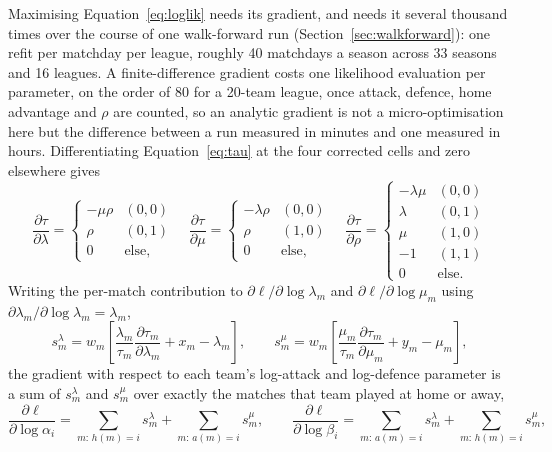 \documentclass[11pt,a4paper]{article}
\begin{document}
Maximising Equation~\eqref{eq:loglik} needs its gradient, and needs it
several thousand times over the course of one walk-forward run
(Section~\ref{sec:walkforward}): one refit per matchday per league, roughly
40 matchdays a season across 33 seasons and 16 leagues. A finite-difference
gradient costs one likelihood evaluation per parameter, on the order of 80
for a 20-team league, once attack, defence, home advantage and $\rho$ are
counted, so an analytic gradient is not a micro-optimisation here but the
difference between a run measured in minutes and one measured in hours.
Differentiating Equation~\eqref{eq:tau} at the four corrected cells and zero
elsewhere gives
\begin{equation}
  \frac{\partial\tau}{\partial\lambda} =
  \begin{cases} -\mu\rho & (0,0) \\ \rho & (0,1) \\ 0 & \text{else,} \end{cases}
  \quad
  \frac{\partial\tau}{\partial\mu} =
  \begin{cases} -\lambda\rho & (0,0) \\ \rho & (1,0) \\ 0 & \text{else,} \end{cases}
  \quad
  \frac{\partial\tau}{\partial\rho} =
  \begin{cases}
    -\lambda\mu & (0,0) \\ \lambda & (0,1) \\ \mu & (1,0) \\ -1 & (1,1) \\
    0 & \text{else.}
  \end{cases}
  \label{eq:tau-grad}
\end{equation}
Writing the per-match contribution to $\partial\ell/\partial\log\lambda_m$ and
$\partial\ell/\partial\log\mu_m$ using $\partial\lambda_m/\partial\log\lambda_m
= \lambda_m$,
\begin{equation}
  s^\lambda_m = w_m\left[\frac{\lambda_m}{\tau_m}
    \frac{\partial\tau_m}{\partial\lambda_m} + x_m - \lambda_m\right],
  \qquad
  s^\mu_m = w_m\left[\frac{\mu_m}{\tau_m}
    \frac{\partial\tau_m}{\partial\mu_m} + y_m - \mu_m\right],
  \label{eq:score-terms}
\end{equation}
the gradient with respect to each team's log-attack and log-defence
parameter is a sum of $s^\lambda_m$ and $s^\mu_m$ over exactly the matches
that team played at home or away,
\begin{equation}
  \frac{\partial\ell}{\partial\log\alpha_i} =
    \sum_{m:\,h(m)=i} s^\lambda_m + \sum_{m:\,a(m)=i} s^\mu_m,
  \qquad
  \frac{\partial\ell}{\partial\log\beta_i} =
    \sum_{m:\,a(m)=i} s^\lambda_m + \sum_{m:\,h(m)=i} s^\mu_m,
  \label{eq:grad-team}
\end{equation}
\end{document}
